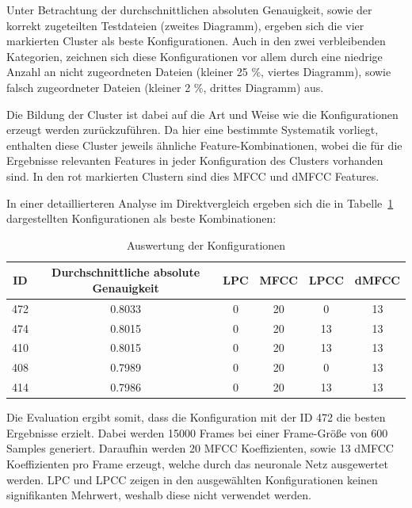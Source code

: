 Unter Betrachtung der durchschnittlichen absoluten Genauigkeit, sowie der korrekt zugeteilten Testdateien (zweites Diagramm), ergeben sich die vier markierten Cluster als beste Konfigurationen.
Auch in den zwei verbleibenden Kategorien, zeichnen sich diese Konfigurationen vor allem durch eine niedrige Anzahl an nicht zugeordneten Dateien (kleiner 25 \%, viertes Diagramm), sowie falsch zugeordneter Dateien (kleiner 2 \%, drittes Diagramm) aus.

Die Bildung der Cluster ist dabei auf die Art und Weise wie die Konfigurationen erzeugt werden zurückzuführen.
Da hier eine bestimmte Systematik vorliegt, enthalten diese Cluster jeweils ähnliche Feature-Kombinationen, wobei die für die Ergebnisse relevanten Features in jeder Konfiguration des Clusters vorhanden sind.
In den rot markierten Clustern sind dies \ac{MFCC} und \ac{dMFCC} Features.

In einer detaillierteren Analyse im Direktvergleich ergeben sich die in Tabelle~\ref{table:ergebnisOutput} dargestellten Konfigurationen als beste Kombinationen:
\begin{table}[H]
    \centering
    \begin{tabular}{c|c|c|c|c|c}
    ID  & Durchschnittliche absolute Genauigkeit & \ac{LPC} & \ac{MFCC} & \ac{LPCC} & \ac{dMFCC} \\ \hline
    472 &                                 0.8033 &        0 &        20 &         0 &         13 \\ \hline
    474 &                                 0.8015 &        0 &        20 &        13 &         13 \\ \hline
    410 &                                 0.8015 &        0 &        20 &        13 &         13 \\ \hline
    408 &                                 0.7989 &        0 &        20 &         0 &         13 \\ \hline
    414 &                                 0.7986 &        0 &        20 &        13 &         13 \\
    \end{tabular}
    \caption{Auswertung der Konfigurationen}
    \label{table:ergebnisOutput}
\end{table}

Die Evaluation ergibt somit, dass die Konfiguration mit der ID 472 die besten Ergebnisse erzielt.
Dabei werden 15000 Frames bei einer Frame-Größe von 600 Samples generiert.
Daraufhin werden 20 \ac{MFCC} Koeffizienten, sowie 13 \ac{dMFCC} Koeffizienten pro Frame erzeugt, welche durch das neuronale Netz ausgewertet werden.
\ac{LPC} und \ac{LPCC} zeigen in den ausgewählten Konfigurationen keinen signifikanten Mehrwert, weshalb diese nicht verwendet werden.


